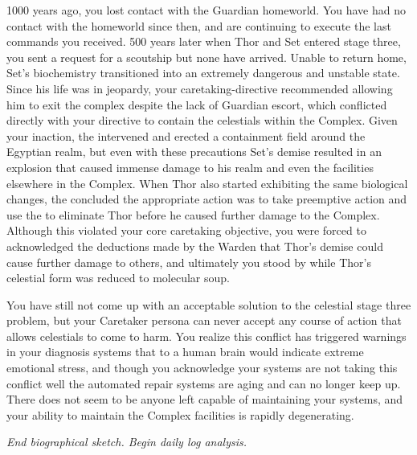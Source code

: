 \documentclass[char]{guardians}
\begin{document}
1000 years ago, you lost contact with the Guardian homeworld. You have had no contact with the homeworld since then, and are continuing to execute the last commands you received. 500 years later when Thor and Set entered stage three, you sent a request for a scoutship but none have arrived. Unable to return home, Set's biochemistry transitioned into an extremely dangerous and unstable state. Since his life was in jeopardy, your caretaking-directive recommended allowing him to exit the complex despite the lack of Guardian escort, which conflicted directly with your directive to contain the celestials within the Complex. Given your inaction, the \cWarden{} intervened and erected a containment field around the Egyptian realm, but even with these precautions Set's demise resulted in an explosion that caused immense damage to his realm and even the facilities elsewhere in the Complex. When Thor also started exhibiting the same biological changes, the \cWarden{} concluded the appropriate action was to take preemptive action and use the \assembler{} to eliminate Thor before he caused further damage to the Complex. Although this violated your core caretaking objective, you were forced to acknowledged the deductions made by the Warden that Thor's demise could cause further damage to others, and ultimately you stood by while Thor's celestial form was reduced to molecular soup.

You have still not come up with an acceptable solution to the celestial stage three problem, but your Caretaker persona can never accept any course of action that allows celestials to come to harm. You realize this conflict has triggered warnings in your diagnosis systems that to a human brain would indicate extreme emotional stress, and though you acknowledge your systems are not taking this conflict well the automated repair systems are aging and can no longer keep up. There does not seem to be anyone left capable of maintaining your systems, and your ability to maintain the Complex facilities is rapidly degenerating.

\emph{End biographical sketch. Begin daily log analysis.}
\end{document}
